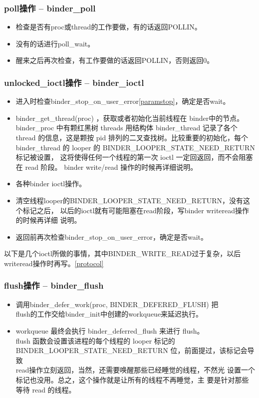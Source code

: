 \documentclass[a4paper,11pt]{article}
\begin{document}
\subsubsection{poll操作 -- binder_poll}
\begin{itemize}
    \item 检查是否有proc或thread的工作要做，有的话返回POLLIN。
    \item 没有的话进行poll_wait。
    \item 醒来之后再次检查，有工作要做的话返回POLLIN，否则返回0。
\end{itemize}

\subsubsection{unlocked_ioctl操作 -- binder_ioctl}
\begin{itemize}
    \item 进入时检查binder_stop_on_user_error{\tiny\ref{paramstop}}，确定是否wait。
    \item  binder_get_thread(proc) ，获取或者初始化当前线程在 binder中的节点。
        binder_proc 中有颗红黑树 threads 用结构体 binder_thread 记录了各个
        thread 的信息，这是颗按 pid 排列的二叉查找树。比较重要的初始化，每个
        binder_thread 的 looper 的 BINDER_LOOPER_STATE_NEED_RETURN标记被设置，
        这将使得任何一个线程的第一次 ioctl 一定回返回，而不会阻塞在 read 阶段。
        binder write/read 操作的时候再详细说明。
    \item 各种binder ioctl操作。
    \item 清空线程looper的BINDER_LOOPER_STATE_NEED_RETURN，没有这个标记之后，
        以后的ioctl就有可能阻塞在read阶段，写binder writeread操作的时候再详细
        说明。
    \item 返回前再次检查binder_stop_on_user_error，确定是否wait。
\end{itemize}

以下是几个ioctl所做的事情，其中BINDER_WRITE_READ过于复杂，以后
writeread操作时再写。\ref{protocol}

\subsubsection{flush操作 -- binder_flush}
\begin{itemize}
    \item 调用binder_defer_work(proc, BINDER_DEFERED_FLUSH)
        把\\flush的工作交给binder_init中创建的workqueue来延迟执行。
    \item workqueue 最终会执行 binder_deferred_flush 来进行 flush。
        \\flush 函数会设置该进程的每个线程的 looper 标记的
        BINDER_LOOPER_STATE_NEED_RETURN 位，前面提过，该标记会导致
        \\read操作立刻返回，当然，还需要唤醒那些已经睡觉的线程，不然光
        设置一个标记也没用。总之，这个操作就是让所有的线程不再睡觉，主
        要是针对那些等待 read 的线程。
\end{itemize}
\end{document}
